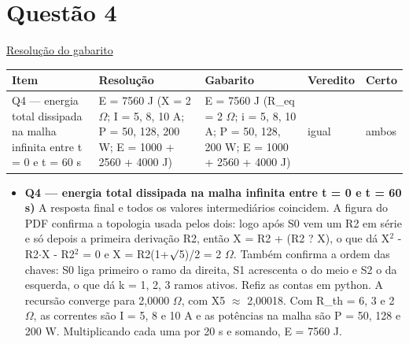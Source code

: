 \documentclass{article}%
\begin{document}
\section*{Questão 4}%
\href{https://poliedroresolve.sistemapoliedro.com.br/vestibulares/ime/2026/ime-2-fase-dia-2-24-10-2025-2-fase-dia-2/dissertativa-4-fisica-2-fase-dia-2-ime-2026}{Resolução do gabarito}\par\smallskip%
\begin{longtable}{@{}p{} p{} p{} p{} p{}@{}}\toprule Item & Resolução & Gabarito & Veredito & Certo \\ \midrule
Q4 --- energia total dissipada na malha infinita entre t = 0 e t = 60 s & E = 7560 J (X = 2 $\Omega$; I = 5, 8, 10 A; P = 50, 128, 200 W; E = 1000 + 2560 + 4000 J) & E = 7560 J (R\_eq = 2 $\Omega$; i = 5, 8, 10 A; P = 50, 128, 200 W; E = 1000 + 2560 + 4000 J) & igual & ambos \\
\bottomrule\end{longtable}%
\begin{itemize}%
\item%
\textbf{Q4 --- energia total dissipada na malha infinita entre t = 0 e t = 60 s)} A resposta final e todos os valores intermediários coincidem. A figura do PDF confirma a topologia usada pelos dois: logo após S0 vem um R2 em série e só depois a primeira derivação R2, então X = R2 + (R2 ? X), o que dá X$^2$ - R2$\cdot$X - R2$^2$ = 0 e X = R2(1+$\surd$5)/2 = 2 $\Omega$. Também confirma a ordem das chaves: S0 liga primeiro o ramo da direita, S1 acrescenta o do meio e S2 o da esquerda, o que dá k = 1, 2, 3 ramos ativos. Refiz as contas em python. A recursão converge para 2,0000 $\Omega$, com X5 $\approx$ 2,00018. Com R\_th = 6, 3 e 2 $\Omega$, as correntes são I = 5, 8 e 10 A e as potências na malha são P = 50, 128 e 200 W. Multiplicando cada uma por 20 s e somando, E = 7560 J.%
\end{itemize}%
\end{document}
